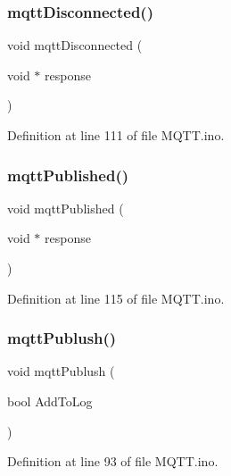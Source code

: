 \subsubsection{\texorpdfstring{mqttDisconnected()}{mqttDisconnected()}}
{\footnotesize\ttfamily void mqtt\+Disconnected (\begin{DoxyParamCaption}\item[{void $\ast$}]{response }\end{DoxyParamCaption})}



Definition at line 111 of file M\+Q\+T\+T.\+ino.

\mbox{\label{_m_q_t_t_8ino_a9b7c7d96670d3bcde774877e8995d105}} 
\subsubsection{\texorpdfstring{mqttPublished()}{mqttPublished()}}
{\footnotesize\ttfamily void mqtt\+Published (\begin{DoxyParamCaption}\item[{void $\ast$}]{response }\end{DoxyParamCaption})}



Definition at line 115 of file M\+Q\+T\+T.\+ino.

\mbox{\label{_m_q_t_t_8ino_ac3c091acc43bad71dff31c5b163db0d6}} 
\subsubsection{\texorpdfstring{mqttPublush()}{mqttPublush()}}
{\footnotesize\ttfamily void mqtt\+Publush (\begin{DoxyParamCaption}\item[{bool}]{Add\+To\+Log }\end{DoxyParamCaption})}



Definition at line 93 of file M\+Q\+T\+T.\+ino.

\mbox{\label{_m_q_t_t_8ino_a5817593b2815aca99b49db41903204d3}} 
